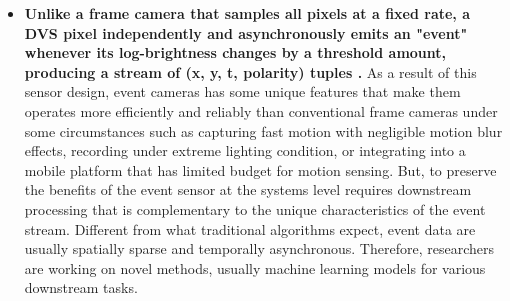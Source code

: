 \begin{itemize}
  \item \textbf{Unlike a frame camera that samples all pixels at a fixed rate, a DVS pixel independently and asynchronously emits an "event" whenever its log-brightness changes by a threshold amount, producing a stream of (x, y, t, polarity) tuples \cite{lichtsteiner2008dvs,gallego2022event}.} As a result of this sensor design, event cameras has some unique features that make them operates more efficiently and reliably than conventional frame cameras under some circumstances such as capturing fast motion with negligible motion blur effects, recording under extreme lighting condition, or integrating into a mobile platform that has limited budget for motion sensing. But, to preserve the benefits of the event sensor at the systems level requires downstream processing that is complementary to the unique characteristics of the event stream. Different from what traditional algorithms expect, event data are usually spatially sparse and temporally asynchronous. Therefore, researchers are working on novel methods, usually machine learning models for various downstream tasks.  

  
    




\end{itemize}
